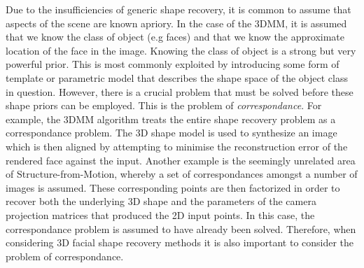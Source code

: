 Due to the insufficiencies of generic shape recovery, it is common to assume
that aspects of the scene are known apriory. In the case of the 3DMM, it is 
assumed that we know the class of object (e.g faces) and that we know the
approximate location of the face in the image. Knowing the class of object is
a strong but very powerful prior. This is most commonly exploited by introducing
some form of template or parametric model that describes the shape space of the
object class in question. However, there is a crucial problem that must be
solved before these shape priors can be employed. This is the problem of
\textit{correspondance}. For example, the 3DMM algorithm treats the entire
shape recovery problem as a correspondance problem. The 3D shape
model is used to synthesize an image which is then aligned by attempting to
minimise the reconstruction error of the rendered face against the input.
Another example is the seemingly unrelated area of Structure-from-Motion,
whereby a set of correspondances amongst a number of images is assumed. These
corresponding points are then factorized in order to recover both the underlying
3D shape and the parameters of the camera projection matrices that produced the
2D input points. In this case, the correspondance problem is assumed to have
already been solved. Therefore, when considering 3D facial shape recovery
methods it is also important to consider the problem of correspondance.
